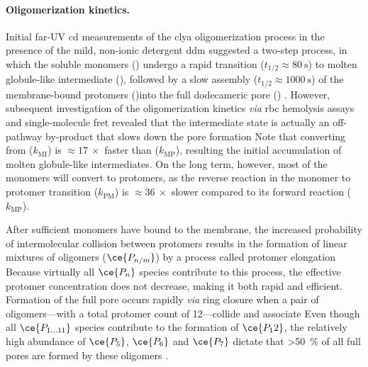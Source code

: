 \paragraph{Oligomerization kinetics.}
%
Initial far-UV \gls{cd} measurements of the \gls{clya} oligomerization process in the presence of the mild,
non-ionic detergent \gls{ddm} suggested a two-step process, in which the soluble monomers () undergo a
rapid transition ($t_{1/2} \approx \SI{80}{\second}$) to molten globule-like intermediate (), followed
by a slow assembly  ($t_{1/2} \approx \SI{1000}{\second}$) of the membrane-bound protomers ()into the
full dodecameric pore () \cite{Eifler-2006}. However, subsequent investigation of the oligomerization
kinetics \textit{via} \gls{rbc} hemolysis assays \cite{Vaidyanathan-2014} and single-molecule
\gls{fret} \cite{Benke-2015} revealed that the intermediate state is actually an off-pathway by-product that
slows down the pore formation \cite{Roderer-2017}
%
%
Note that converting from  ($k_{\text{MI}}$) is $\approx17~\times$ faster than 
($k_{\text{MP}}$), resulting the initial accumulation of molten globule-like intermediates. On the long term,
however, most of the monomers will convert to protomers, as the reverse reaction in the monomer to protomer
transition  ($k_{\text{PM}}$) is $\approx36~\times$ slower compared to its forward reaction
 ($k_{\text{MP}}$).

After sufficient monomers have bound to the membrane, the increased probability of intermolecular collision
between protomers results in the formation of linear mixtures of oligomers ($\ce{P_{n/m}}$) by a process
called protomer elongation \cite{Roderer-2017}
%
%
Because virtually all $\ce{P_n}$ species contribute to this process, the effective protomer concentration does
not decrease, making it both rapid and efficient. Formation of the full pore occurs rapidly \textit{via} ring
closure when a pair of oligomers---with a total protomer count of 12---collide and associate
%
%
Even though all $\ce{P_{1\ldots11}}$ species contribute to the formation of $\ce{P_12}$, the relatively high
abundance of $\ce{P_5}$, $\ce{P_6}$ and $\ce{P_7}$ dictate that \SI{>50}{\percent} of all full pores are
formed by these oligomers \cite{Benke-2015}.


